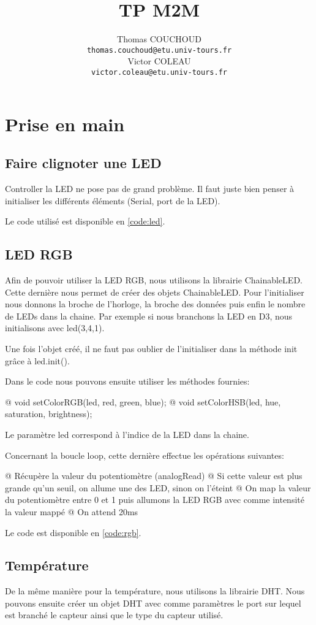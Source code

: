 \documentclass{report}
\title{TP M2M}
\author{Thomas COUCHOUD\\\texttt{thomas.couchoud@etu.univ-tours.fr}\\Victor COLEAU\\\texttt{victor.coleau@etu.univ-tours.fr}}
\begin{document}
	\mccTitle
	
	\chapter{Prise en main}
		\section{Faire clignoter une LED}
			Controller la LED ne pose pas de grand problème.
			Il faut juste bien penser à initialiser les différents éléments (Serial, port de la LED).
			
			Le code utilisé est disponible en \autoref{code:led}.
			
		\section{LED RGB}
			Afin de pouvoir utiliser la LED RGB, nous utilisons la librairie ChainableLED.
			Cette dernière nous permet de créer des objets ChainableLED.
			Pour l'initialiser nous donnons la broche de l'horloge, la broche des données puis enfin le nombre de LEDs dans la chaine.
			Par exemple si nous branchons la LED en D3, nous initialisons avec led(3,4,1).
			
			Une fois l'objet créé, il ne faut pas oublier de l'initialiser dans la méthode init grâce à led.init().
			
			Dans le code nous pouvons ensuite utiliser les méthodes fournies:
			\begin{easylist}[itemize]
				@ void setColorRGB(led, red, green, blue);
				@ void setColorHSB(led, hue, saturation, brightness);
			\end{easylist}
			
  			Le paramètre led correspond à l'indice de la LED dans la chaine.
  			
  			Concernant la boucle loop, cette dernière effectue les opérations suivantes:
  			\begin{easylist}[itemize]
  				@ Récupère la valeur du potentiomètre (analogRead)
  				@ Si cette valeur est plus grande qu'un seuil, on allume une des LED, sinon on l'éteint
  				@ On map la valeur du potentiomètre entre 0 et 1 puis allumons la LED RGB avec comme intensité la valeur mappé
  				@ On attend 20ms
  			\end{easylist}
  			
  			Le code est disponible en \autoref{code:rgb}.
  			
  		\section{Température}
  			De la même manière pour la température, nous utilisons la librairie DHT.
  			Nous pouvons ensuite créer un objet DHT avec comme paramètres le port sur lequel est branché le capteur ainsi que le type du capteur utilisé.
  			
\end{document}
